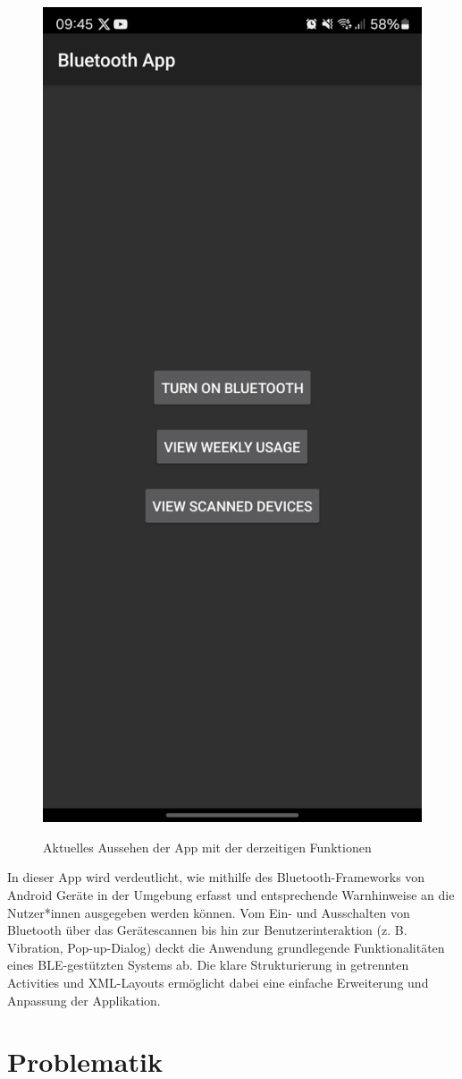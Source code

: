 \documentclass[a4paper, 12pt]{article} %
\begin{document}
\begin{spacing}{1.8}
    \begin{figure}[H]
        \includegraphics[width=0.5\linewidth]{images/Screenshot_20250113_094506_Bluetooth App.jpg}\\[1ex]
        \centering
        \caption{Aktuelles Aussehen der App mit der derzeitigen Funktionen\cite{lukiano12_lkw_assist}}
        \label{ABBILDUNG 76}
    \end{figure}

In dieser App wird verdeutlicht, wie mithilfe des Bluetooth-Frameworks von Android Geräte in der Umgebung erfasst und entsprechende Warnhinweise an 
die Nutzer*innen ausgegeben werden können. Vom Ein- und Ausschalten von Bluetooth über das Gerätescannen bis hin zur Benutzerinteraktion 
(z. B. Vibration, Pop-up-Dialog) deckt die Anwendung grundlegende Funktionalitäten eines BLE-gestützten Systems ab. 
Die klare Strukturierung in getrennten Activities und XML-Layouts ermöglicht dabei eine einfache Erweiterung und Anpassung der Applikation.
\end{spacing}

\clearpage

\section{Problematik}
\end{document}
